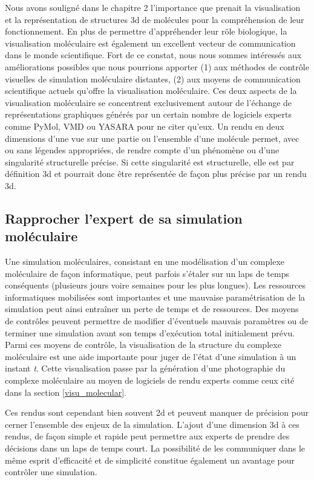 Nous avons souligné dans le chapitre 2 l'importance que prenait la visualisation et la représentation de structures 3d de molécules pour la compréhension de leur fonctionnement. En plus de permettre d'appréhender leur rôle biologique, la visualisation moléculaire est également un excellent vecteur de communication dans le monde scientifique. Fort de ce constat, nous nous sommes intéressés aux améliorations possibles que nous pourrions apporter (1) aux méthodes de contrôle visuelles de simulation moléculaire distantes, (2) aux moyens de communication scientifique actuels qu'offre la visualisation moléculaire. Ces deux aspects de la visualisation moléculaire se concentrent exclusivement autour de l'échange de représentations graphiques générés par un certain nombre de logiciels experts comme PyMol, VMD ou YASARA pour ne citer qu'eux. Un rendu en deux dimensions d'une vue sur une partie ou l'ensemble d'une molécule permet, avec ou sans légendes appropriées, de rendre compte d'un phénomène ou d'une singularité structurelle précise. Si cette singularité est structurelle, elle est par définition 3d et pourrait donc être représentée de façon plus précise par un rendu 3d.

\subsection{Rapprocher l'expert de sa simulation moléculaire}

Une simulation moléculaires, consistant en une modélisation d'un complexe moléculaire de façon informatique, peut parfois s'étaler sur un laps de temps conséquents (plusieurs jours voire semaines pour les plus longues). Les ressources informatiques mobilisées sont importantes et une mauvaise paramétrisation de la simulation peut ainsi entraîner un perte de temps et de ressources. Des moyens de contrôles peuvent permettre de modifier d'éventuels mauvais paramètres ou de terminer une simulation avant son temps d'exécution total initialement prévu. Parmi ces moyens de contrôle, la visualisation de la structure du complexe moléculaire est une aide importante pour juger de l'état d'une simulation à un instant \textit{t}.
Cette visualisation passe par la génération d'une photographie du complexe moléculaire au moyen de logiciels de rendu experts comme ceux cité dans la section \ref{visu_molecular}.

Ces rendus sont cependant bien souvent 2d et peuvent manquer de précision pour cerner l'ensemble des enjeux de la simulation. L'ajout d'une dimension 3d à ces rendus, de façon simple et rapide peut permettre aux experts de prendre des décisions dans un laps de temps court. La possibilité de les communiquer dans le même esprit d'efficacité et de simplicité constitue également un avantage pour contrôler une simulation.

